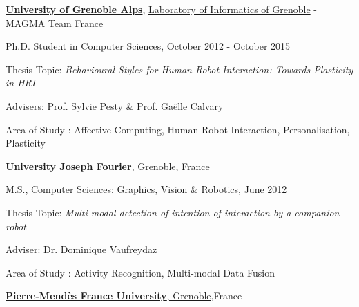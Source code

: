 \documentclass[10pt]{article}
\begin{document}
\href{http://www.univ-grenoble-alpes.fr/}{\textbf{University of Grenoble Alps}}, \href{http://liglab.fr}{Laboratory of Informatics of Grenoble} - \href{http://magma.imag.fr}{MAGMA Team} France
\begin{outerlist}
\begin{small}


\item[] Ph.D. Student in Computer Sciences, October 2012 - October 2015
        \begin{innerlist}
        \item Thesis Topic: \emph{Behavioural Styles for Human-Robot Interaction: Towards Plasticity in HRI}
        \item Advisers:
              \href{http://magma.imag.fr/content/sylvie-pesty}
                   {Prof. Sylvie Pesty} \& 
              \href{http://iihm.imag.fr/calvary/}
                   {Prof. Gaëlle Calvary}
        \item Area of Study : Affective Computing, Human-Robot Interaction, Personalisation, Plasticity
        \end{innerlist}
\end{small}
\end{outerlist}
\vspace{0.5cm}
\href{https://www.ujf-grenoble.fr/?language=en}{\textbf{University Joseph Fourier}, Grenoble}, France
\begin{outerlist}
\begin{small}
\item[] M.S.,
             {Computer Sciences: Graphics, Vision \& Robotics}, June 2012
        \begin{innerlist}
        \item Thesis Topic: \emph{Multi-modal detection of intention of interaction by a companion robot}
        \item Adviser:
              \href{https://team.inria.fr/prima/vaufreydaz/}
                   {Dr. Dominique Vaufreydaz}
        \item Area of Study : Activity Recognition, Multi-modal Data Fusion
        \end{innerlist}
\end{small}
\end{outerlist}
\vspace{0.5cm}
\href{http://www.upmf-grenoble.fr/}{\textbf{ Pierre-Mendès France University}, Grenoble},France
\end{document}
